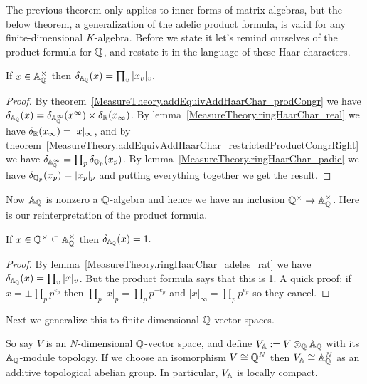The previous theorem only applies to inner forms of matrix algebras, but the below theorem,
a generalization of the adelic product formula, is valid for any finite-dimensional
$K$-algebra. Before we state it let's remind ourselves of the product formula for $\mathbb{Q}$,
and restate it in the language of these Haar characters.

\begin{lemma}
  \label{MeasureTheory.ringHaarChar_adeles_rat}
  \leanok
  If $x\in\mathbb{A}_{\mathbb{Q}}^\times$ then $\delta_{\mathbb{A}_{\mathbb{Q}}}(x)=\prod_v|x_v|_v.$
\end{lemma}
\begin{proof}
  By theorem~\ref{MeasureTheory.addEquivAddHaarChar_prodCongr}
  we have $\delta_{\mathbb{A}_{\mathbb{Q}}}(x)=\delta_{\mathbb{A}_{\mathbb{Q}}^\infty}(x^\infty)\times\delta_{\mathbb{R}}(x_\infty)$.
  By lemma~\ref{MeasureTheory.ringHaarChar_real} we have $\delta_{\mathbb{R}}(x_\infty)=|x|_\infty$, and by
  theorem~\ref{MeasureTheory.addEquivAddHaarChar_restrictedProductCongrRight} we have
  $\delta_{\mathbb{A}_{\mathbb{Q}}^\infty}=\prod_p\delta_{\mathbb{Q}_p}(x_p)$. By lemma~\ref{MeasureTheory.ringHaarChar_padic}
  we have $\delta_{\mathbb{Q}_p}(x_p)=|x_p|_p$ and putting everything together we get the result.
\end{proof}

Now $\mathbb{A}_{\mathbb{Q}}$ is nonzero a $\mathbb{Q}$-algebra and hence we have an inclusion $\mathbb{Q}^\times\to\mathbb{A}_{\mathbb{Q}}^\times$.
Here is our reinterpretation of the product formula.

\begin{lemma}
  \label{MeasureTheory.ringHaarChar_adeles_units_rat_eq_one}
  \leanok
  If $x\in\mathbb{Q}^\times\subseteq\mathbb{A}_{\mathbb{Q}}^\times$ then $\delta_{\mathbb{A}_{\mathbb{Q}}}(x)=1.$
\end{lemma}
\begin{proof}
  By lemma~\ref{MeasureTheory.ringHaarChar_adeles_rat} we have $\delta_{\mathbb{A}_{\mathbb{Q}}}(x)=\prod_v|x|_v$.
  But the product formula says that this is 1.
  A quick proof: if $x=\pm\prod_pp^{e_p}$ then $\prod_p|x|_p=\prod_pp^{-e_p}$
  and $|x|_\infty=\prod_pp^{e_p}$ so they cancel.
\end{proof}

  Next we generalize this to finite-dimensional $\mathbb{Q}$-vector spaces.

  So say $V$ is an $N$-dimensional $\mathbb{Q}$-vector space,
  and define $V_{\mathbb{A}}:= V\otimes_{\mathbb{Q}}\mathbb{A}_{\mathbb{Q}}$ with its $\mathbb{A}_{\mathbb{Q}}$-module topology.
  If we choose an isomorphism $V\cong\mathbb{Q}^N$ then $V_{\mathbb{A}}\cong\mathbb{A}_{\mathbb{Q}}^N$
  as an additive topological abelian group. In particular, $V_{\mathbb{A}}$ is locally compact.

